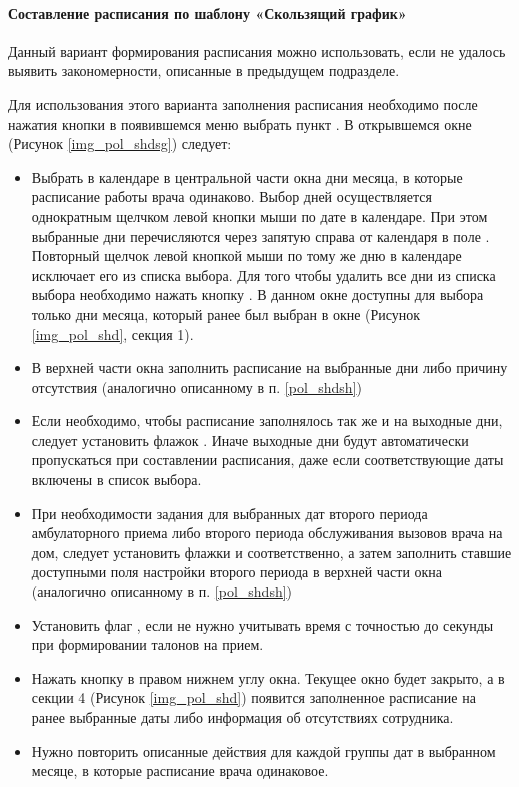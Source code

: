 \paragraph{Составление расписания по шаблону «Скользящий график»} \label{pol_shdsg}

Данный вариант формирования расписания можно использовать, если не удалось выявить закономерности, описанные в предыдущем подразделе.

Для использования этого варианта заполнения расписания необходимо после нажатия кнопки   в появившемся меню выбрать пункт . В открывшемся окне  (Рисунок \ref{img_pol_shdsg}) следует:
\begin{itemize}
 \item Выбрать в календаре в центральной части окна дни месяца, в которые расписание работы врача одинаково. Выбор дней осуществляется однократным щелчком левой кнопки мыши по дате в календаре. При этом выбранные дни перечисляются через запятую справа от календаря в поле . Повторный щелчок левой кнопкой мыши по тому же дню в календаре исключает его из списка выбора. Для того чтобы удалить все дни из списка выбора необходимо нажать кнопку . В данном окне доступны для выбора только дни месяца, который ранее был выбран в окне  (Рисунок \ref{img_pol_shd}, секция 1).
 \item В верхней части окна заполнить расписание на выбранные дни либо причину отсутствия (аналогично описанному в п. \ref{pol_shdsh})
 \item Если необходимо, чтобы расписание заполнялось так же и на выходные дни, следует установить флажок . Иначе выходные дни будут автоматически пропускаться при составлении расписания, даже если соответствующие даты включены в список выбора.
 \item При необходимости задания для выбранных дат второго периода амбулаторного приема либо второго периода обслуживания вызовов врача на дом, следует установить флажки  и  соответственно, а затем заполнить ставшие доступными поля настройки второго периода в верхней части окна (аналогично описанному в п. \ref{pol_shdsh})
 \item Установить флаг , если не нужно учитывать время с точностью до секунды при формировании талонов на прием.
 \item Нажать кнопку  в правом нижнем углу окна. Текущее окно будет закрыто, а в секции 4 (Рисунок \ref{img_pol_shd}) появится заполненное расписание на ранее выбранные даты либо информация об отсутствиях сотрудника.
 \item Нужно повторить описанные действия для каждой группы дат в выбранном месяце, в которые расписание врача одинаковое.
\end{itemize}

